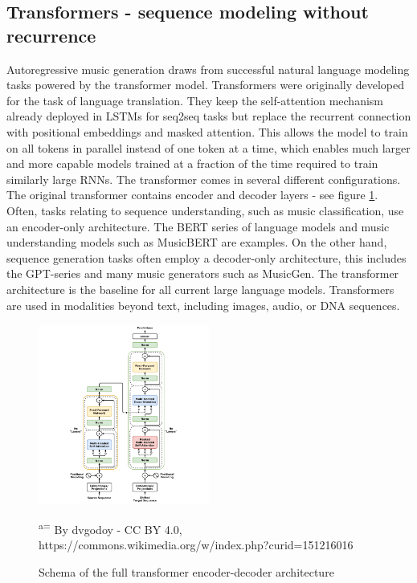 \subsection{Transformers - sequence modeling without recurrence}
Autoregressive music generation draws from successful natural language modeling tasks powered by the transformer model. Transformers were originally developed for the task of language translation.\cite{Vaswani_Shazeer_Parmar_Uszkoreit_Jones_Gomez_Kaiser_Polosukhin_2017} They keep the self-attention mechanism already deployed in LSTMs for seq2seq tasks \cite{Sutskever_Vinyals_Le_2014} but replace the recurrent connection with positional embeddings and masked attention. This allows the model to train on all tokens in parallel instead of one token at a time, which enables much larger and more capable models trained at a fraction of the time required to train similarly large RNNs. The transformer comes in several different configurations. The original transformer contains encoder and decoder layers - see figure \ref{fig:transformer}. Often, tasks relating to sequence understanding, such as music classification, use an encoder-only architecture. The BERT series of language models \cite{Devlin_Chang_Lee_ToutanovaBERT_2019} and music understanding models such as MusicBERT\cite{Zeng_Tan_Wang_MUSICBERT_2021} are examples. 
On the other hand, sequence generation tasks often employ a decoder-only architecture, this includes the GPT-series \cite{Radford_Wu_Child_Luan_gpt2_2019} and many music generators such as MusicGen\cite{copet2023simple}. The transformer architecture is the baseline for all current large language models. Transformers are used in modalities beyond text, including images, audio, or DNA sequences.

\begin{figure}[H]
    \centering
    \includegraphics[width=0.5\textwidth]{IMAGES/Transformer,_full_architecture.png} 
    \caption{Schema of the full transformer encoder-decoder architecture}
    \small\textsuperscript{a=} By dvgodoy - CC BY 4.0, https://commons.wikimedia.org/w/index.php?curid=151216016
    \label{fig:transformer}
\end{figure}


